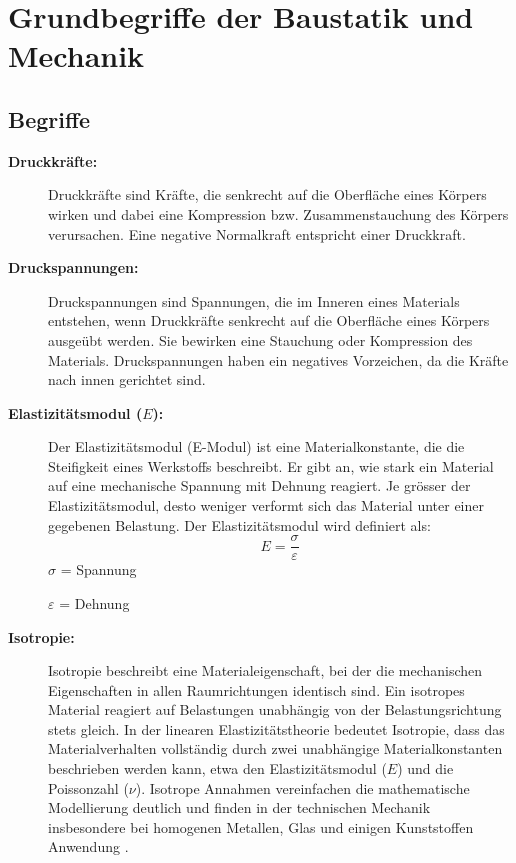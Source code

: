 %
%
%
%
\section{Grundbegriffe der Baustatik und Mechanik}
\label{elastomechanik:section:teil1}
\subsection{Begriffe}
\begin{description}	
	\item[\textbf{Druckkräfte:}] Druckkräfte sind Kräfte, die senkrecht auf die Oberfläche eines Körpers wirken und dabei eine Kompression bzw. Zusammenstauchung des Körpers verursachen. 
	Eine negative Normalkraft entspricht einer Druckkraft.
	
	\item[\textbf{Druckspannungen:}] Druckspannungen sind Spannungen, die im Inneren eines Materials entstehen, wenn Druckkräfte senkrecht auf die Oberfläche eines Körpers ausgeübt werden. 
	Sie bewirken eine Stauchung oder Kompression des Materials.
	Druckspannungen haben ein negatives Vorzeichen, da die Kräfte nach innen gerichtet sind.
	
	\item[\textbf{Elastizitätsmodul ($E$):}] Der Elastizitätsmodul (E-Modul) ist eine Materialkonstante, die die Steifigkeit eines Werkstoffs beschreibt. 
	Er gibt an, wie stark ein Material auf eine mechanische Spannung mit Dehnung reagiert. 
	Je grösser der Elastizitätsmodul, desto weniger verformt sich das Material unter einer gegebenen Belastung.
	Der Elastizitätsmodul wird definiert als:
	\begin{equation}
		E=
		\frac{\sigma}{\varepsilon}
	\end{equation}
	$\sigma$ = Spannung
	
	$\varepsilon$ = Dehnung
	
	\item[\textbf{Isotropie:}] Isotropie beschreibt eine Materialeigenschaft, bei der die mechanischen Eigenschaften in allen Raumrichtungen identisch sind. 
	Ein isotropes Material reagiert auf Belastungen unabhängig von der Belastungsrichtung stets gleich.
	In der linearen Elastizitätstheorie bedeutet Isotropie, dass das Materialverhalten vollständig durch zwei unabhängige Materialkonstanten beschrieben werden kann, etwa den Elastizitätsmodul ($E$) und die Poissonzahl ($\nu$).  
	Isotrope Annahmen vereinfachen die mathematische Modellierung deutlich und finden in der technischen Mechanik insbesondere bei homogenen Metallen, Glas und einigen Kunststoffen Anwendung \cite{elastomechanik:Isotropie}.
	

\end{description}
